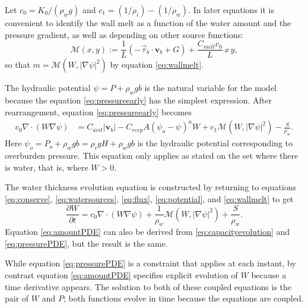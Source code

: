 \documentclass[11pt]{amsart}
\newcommand{\bv}{\mathbf{v}}
\newcommand{\Cavit}{C_{avit}}
\newcommand{\Cmelt}{C_{melt}}
\newcommand{\Creep}{C_{reep}}
\begin{document}
Let $c_0 = K_0 / (\rho_w g)$ and $c_1=(1/\rho_i)-(1/\rho_w)$.  In later equations it is convenient to identify the wall melt as a function of the water amount and the pressure gradient, as well as depending on other source functions:
\begin{equation}\label{eq:wallmelt}
\mathcal{M}(x,y) := \frac{1}{L} \left(-\vec \tau_b\cdot \bv_b + G\right) +  \frac{\Cmelt c_0}{L}\, x\,y,
\end{equation}
so that $m=\mathcal{M}(W,|\nabla \psi|^2)$ by equation \eqref{eq:wallmelt}.

The hydraulic potential $\psi = P + \rho_w g b$ is the natural variable for the model because the equation \eqref{eq:pressureearly} has the simplest expression.  After rearrangement, equation \eqref{eq:pressureearly} becomes
\begin{align}\label{eq:pressurePDE}
c_0 \nabla \cdot \left(W \nabla \psi\right) &= \Cavit |\bv_b| - \Creep A (\psi_o - \psi)^n W + c_1 \mathcal{M}(W,|\nabla \psi|^2) - \frac{S}{\rho_w}.
\end{align}
Here $\psi_o = P_o + \rho_w g b = \rho_i g H + \rho_w g b$ is the hydraulic potential corresponding to overburden pressure.  This equation only applies as stated on the set where there is water, that is, where $W>0$.

The water thickness evolution equation is constructed by returning to equations \eqref{eq:conserve}, \eqref{eq:watersources}, \eqref{eq:flux}, \eqref{eq:potential}, and \eqref{eq:wallmelt} to get
\begin{equation}\label{eq:amountPDE}
\frac{\partial W}{\partial t} = c_0 \nabla \cdot \left(W \nabla \psi\right) + \frac{1}{\rho_w} \mathcal{M}(W,|\nabla \psi|^2) + \frac{S}{\rho_w}.
\end{equation}
Equation \eqref{eq:amountPDE} can also be derived from \eqref{eq:capacityevolution} and \eqref{eq:pressurePDE}, but the result is the same.  

While equation \eqref{eq:pressurePDE} is a constraint that applies at each instant, by contrast equation \eqref{eq:amountPDE} specifies explicit evolution of $W$ because a time derivative appears.  The solution to both of these coupled equations is the pair of $W$ and $P$; both functions evolve in time because the equations are coupled.
\end{document}
